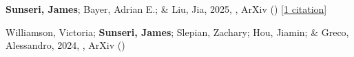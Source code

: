 \item \textbf{Sunseri, James}; Bayer, Adrian E.; \& Liu, Jia, 2025, , ArXiv () [\href{https://ui.adsabs.harvard.edu/abs/2025arXiv250311778S}{1 citation}]

\item Williamson, Victoria; \textbf{Sunseri, James}; Slepian, Zachary; Hou, Jiamin; \& Greco, Alessandro, 2024, , ArXiv ()
